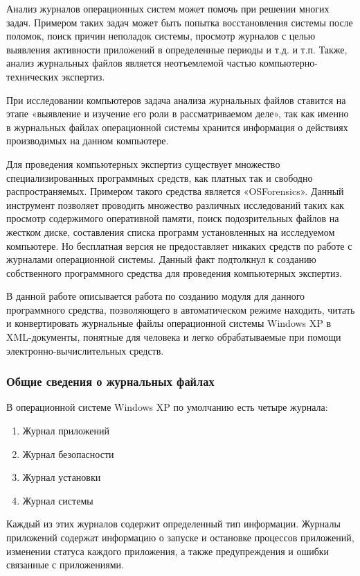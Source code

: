 Анализ журналов операционных систем может помочь при решении многих задач. Примером таких задач может быть попытка восстановления системы после поломок, поиск причин неполадок системы, просмотр журналов с целью выявления активности приложений в определенные периоды и т.д. и т.п. Также, анализ журнальных файлов является неотъемлемой частью компьютерно-технических экспертиз.

При исследовании компьютеров задача анализа журнальных файлов ставится на этапе «выявление и изучение его роли в рассматриваемом деле», так как именно в журнальных файлах операционной системы хранится информация о действиях производимых на данном компьютере.

Для проведения компьютерных экспертиз существует множество специализированных программных средств, как платных так и свободно распространяемых. Примером такого средства является «OSForensics». Данный инструмент позволяет проводить множество различных исследований таких как просмотр содержимого оперативной памяти, поиск подозрительных файлов на жестком диске, составления списка программ установленных на исследуемом компьютере. Но бесплатная версия не предоставляет никаких средств по работе с журналами операционной системы. Данный факт подтолкнул к созданию собственного программного средства для проведения компьютерных экспертиз.

В данной работе описывается работа по созданию модуля для данного программного средства, позволяющего в автоматическом режиме находить, читать и конвертировать журнальные файлы операционной системы Windows XP в XML-документы, понятные для человека и легко обрабатываемые при помощи\\ электронно-вычислительных средств.

\subsubsection{Общие сведения о журнальных файлах}

В операционной системе Windows XP по умолчанию есть четыре журнала:

\begin{enumerate}
\item Журнал приложений
\item Журнал безопасности
\item Журнал установки
\item Журнал системы
\end{enumerate}

Каждый из этих журналов содержит определенный тип информации. Журналы приложений содержат информацию о запуске и остановке процессов приложений, изменении статуса каждого приложения, а также предупреждения и ошибки связанные с приложениями.

